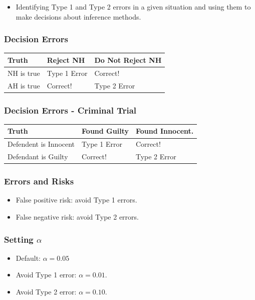 \documentclass{beamer}
\begin{document}
\begin{frame}
  \begin{itemize}
    \item[] 
      Identifying Type 1 and Type 2 errors in a given situation and
      using them to make decisions about inference methods.
  \end{itemize}
\end{frame}

\begin{frame}
  \frametitle{Decision Errors}
  \begin{table}
    \begin{tabular}{l|l|l}
      Truth & Reject NH & Do Not Reject NH \\[1cm]
      \hline
      NH is true & Type 1 Error & Correct! \\[0.5cm]
      AH is true & Correct! & Type 2 Error
    \end{tabular}
  \end{table}
\end{frame}

\begin{frame}
  \frametitle{Decision Errors - Criminal Trial}
  \begin{table}
    \begin{tabular}{l|l|l}
      Truth & Found Guilty & Found Innocent. \\[1cm]
      \hline
      Defendent is Innocent & Type 1 Error & Correct! \\[0.5cm]
      Defendant is Guilty  & Correct! & Type 2 Error
    \end{tabular}
  \end{table}
\end{frame}

\begin{frame}
  \frametitle{Errors and Risks}
  \begin{itemize}
    \item[] False positive risk: avoid Type 1 errors. 
      \vspace{0.5cm}
    \item[] False negative risk: avoid Type 2 errors. 
  \end{itemize}
\end{frame}

\begin{frame}
  \frametitle{Setting $\alpha$}
  \begin{itemize}
    \item[] 
      Default: $\alpha = 0.05$
      \vspace{0.5cm}
    \item[] 
      Avoid Type 1 error: $\alpha = 0.01$. 
      \vspace{0.5cm}
    \item[] 
      Avoid Type 2 error: $\alpha = 0.10$. 
  \end{itemize}
\end{frame}
\end{document}
